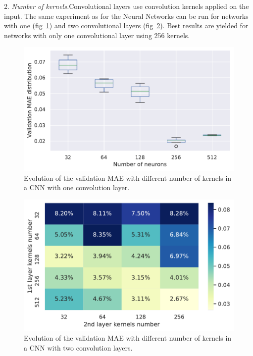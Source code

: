 \documentclass[reprint,amsmath,amssymb,aps,pra]{revtex4-2}
\begin{document}
2. \emph{Number of kernels.}\quad Convolutional layers use convolution kernels applied on the input. The same experiment as for the Neural Networks can be run for networks with one (fig~\ref{fig:CNN_nb_neurons_1layer}) and two convolutional layers (fig~\ref{fig:CNN_nb_neurons_2layer}). Best results are yielded for networks with only one convolutional layer using 256 kernels.
\begin{figure}[H]
\includegraphics[width=\columnwidth]{analytical_continuation/CNN_nb_neurons.pdf}
\caption{\label{fig:CNN_nb_neurons_1layer}Evolution of the validation MAE with different number of kernels in a CNN with one convolution layer.}
\end{figure}
\begin{figure}[H]
\includegraphics[width=\columnwidth]{analytical_continuation/CNN_nb_neurons_2layers2.pdf}
\caption{\label{fig:CNN_nb_neurons_2layer}Evolution of the validation MAE with different number of kernels in a CNN with two convolution layers.}
\end{figure}
\end{document}
